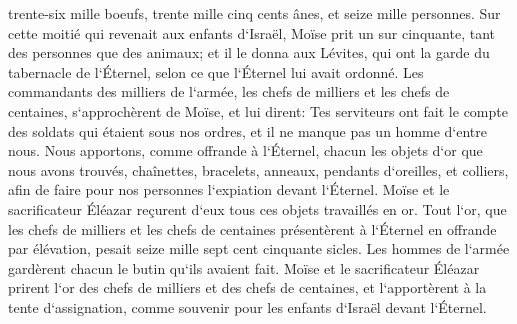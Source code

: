 \verse trente-six mille boeufs, 
\verse trente mille cinq cents ânes, 
\verse et seize mille personnes. 
\verse Sur cette moitié qui revenait aux enfants d`Israël, Moïse prit un sur cinquante, tant des personnes que des animaux; et il le donna aux Lévites, qui ont la garde du tabernacle de l`Éternel, selon ce que l`Éternel lui avait ordonné. 
\verse Les commandants des milliers de l`armée, les chefs de milliers et les chefs de centaines, s`approchèrent de Moïse, 
\verse et lui dirent: Tes serviteurs ont fait le compte des soldats qui étaient sous nos ordres, et il ne manque pas un homme d`entre nous. 
\verse Nous apportons, comme offrande à l`Éternel, chacun les objets d`or que nous avons trouvés, chaînettes, bracelets, anneaux, pendants d`oreilles, et colliers, afin de faire pour nos personnes l`expiation devant l`Éternel. 
\verse Moïse et le sacrificateur Éléazar reçurent d`eux tous ces objets travaillés en or. 
\verse Tout l`or, que les chefs de milliers et les chefs de centaines présentèrent à l`Éternel en offrande par élévation, pesait seize mille sept cent cinquante sicles. 
\verse Les hommes de l`armée gardèrent chacun le butin qu`ils avaient fait. 
\verse Moïse et le sacrificateur Éléazar prirent l`or des chefs de milliers et des chefs de centaines, et l`apportèrent à la tente d`assignation, comme souvenir pour les enfants d`Israël devant l`Éternel. 

